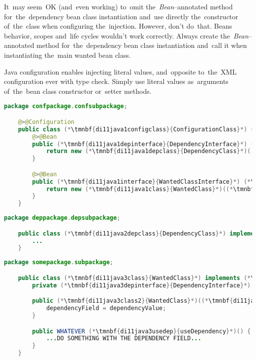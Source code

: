 \warning It~may seem~OK (and~even working) to~omit the~\textit{Bean}--annotated method for~the~dependency bean class instantiation and~use directly the~constructor of~the~class when configuring the~injection.
However, don't do~that.
Beans behavior, scopes and~life cycles wouldn't work correctly.
Always create the~\textit{Bean}--annotated method for~the~dependency bean class instantiation and~call it when instantiating the~main wanted bean class.

\note Java configuration enables injecting literal values, and~opposite to~the~XML configuration ever with type check.
Simply use literal values as~arguments of~the~bean class constructor or~setter methods.
\newpage

\enlargethispage{10mm}
\thispagestyle{empty}
\begin{lstlisting}[language=Java, title={Configuration class}]
    package confpackage.confsubpackage;

    @>@Configuration
    public class (*\tmnbf{di11java1configclass}{ConfigurationClass}*) {
        @>@Bean
        public (*\tmnbf{di11java1depinterface}{DependencyInterface}*) (*\tmnbf{di11java1depbeanid}{dependencyBeanMethod}*)() {
            return new (*\tmnbf{di11java1depclass}{DependencyClass}*)(...);
        }

        @>@Bean
        public (*\tmnbf{di11java1interface}{WantedClassInterface}*) (*\tmnbf{di11java1beanid}{wantedBeanMethod}*)() {
            return new (*\tmnbf{di11java1class}{WantedClass}*)((*\tmnbf{di11java1depbeanid2}{dependencyBeanMethod}*)());
        }
    }
\end{lstlisting}
\begin{lstlisting}[language=Java, title={Dependency class}]
    package deppackage.depsubpackage;

    public class (*\tmnbf{di11java2depclass}{DependencyClass}*) implements (*\tmnbf{di11java2depinterface}{DependencyInterface}*) {
        ...
    }
\end{lstlisting}
\begin{lstlisting}[language=Java, title={Wanted class with the constructor}]
    package somepackage.subpackage;

    public class (*\tmnbf{di11java3class}{WantedClass}*) implements (*\tmnbf{di11java3interface}{WantedClassInterface}*) {
        private (*\tmnbf{di11java3depinterface}{DependencyInterface}*) dependencyField;

        public (*\tmnbf{di11java3class2}{WantedClass}*)((*\tmnbf{di11java3depinterface2}{DependencyInterface}*) dependencyValue) {
            dependencyField = dependencyValue;
        }

        public WHATEVER (*\tmnbf{di11java3usedep}{useDependency}*)() {
            ...DO SOMETHING WITH THE DEPENDENCY FIELD...
        }
    }
\end{lstlisting}
